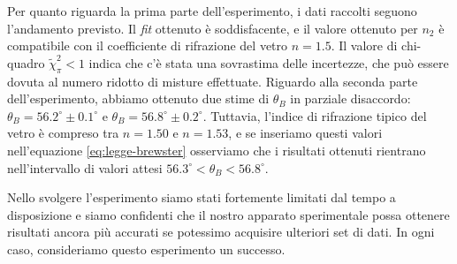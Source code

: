Per quanto riguarda la prima parte dell'esperimento, i dati raccolti seguono l'andamento
previsto. Il \emph{fit} ottenuto è soddisfacente, e
il valore ottenuto per $n_2$ è compatibile con il coefficiente di rifrazione del
vetro $n = 1.5$.
Il valore di chi-quadro
$\tilde \chi^2_\pi < 1$ indica che c'è stata una sovrastima delle incertezze, che può
essere dovuta al numero ridotto di misture effettuate.
Riguardo alla seconda parte dell'esperimento, abbiamo ottenuto due stime di
$\theta_B$ in parziale disaccordo: $\theta_B = 56.2^\circ \pm 0.1^\circ$ e $\theta_B = 56.8^\circ \pm 0.2^\circ$.
Tuttavia, l'indice di rifrazione tipico del vetro è compreso tra $n=1.50$ e $n=1.53$, e se
inseriamo questi valori nell'equazione \eqref{eq:legge-brewster} osserviamo che i risultati
ottenuti rientrano nell'intervallo di valori attesi $56.3^\circ < \theta_{B} < 56.8^\circ$.

Nello svolgere l'esperimento siamo stati fortemente limitati dal tempo a disposizione
e siamo confidenti che il nostro apparato sperimentale possa ottenere risultati ancora
più accurati se potessimo acquisire ulteriori set di dati. In ogni caso, consideriamo
questo esperimento un successo.
\endinput
